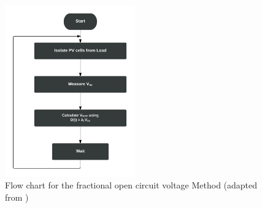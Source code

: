 {  \begin{figure}[H]
        \begin{center}
        \includegraphics[width=0.5\textwidth]{images/Vopen_circuit_Flow}       %
        \caption{ Flow chart for the fractional open circuit voltage Method (adapted from \cite{reza2013classification})}
        \label{fig:focflow}
        \end{center}
        \end{figure}
  
}
